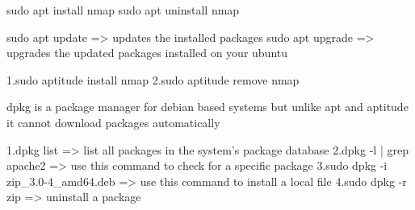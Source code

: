 
                                 
sudo apt install nmap
sudo apt uninstall nmap

sudo apt update => updates the installed packages
sudo apt upgrade => upgrades the updated packages installed on your ubuntu




1.sudo aptitude install nmap
2.sudo aptitude remove nmap



dpkg is a package manager for debian based systems but unlike apt and aptitude it cannot download packages automatically

1.dpkg list => list all packages in the system’s package database
2.dpkg -l | grep apache2 => use this command to check for a specific package
3.sudo dpkg -i zip_3.0-4_amd64.deb => use this command to install a local file
4.sudo dpkg -r zip => uninstall a package
